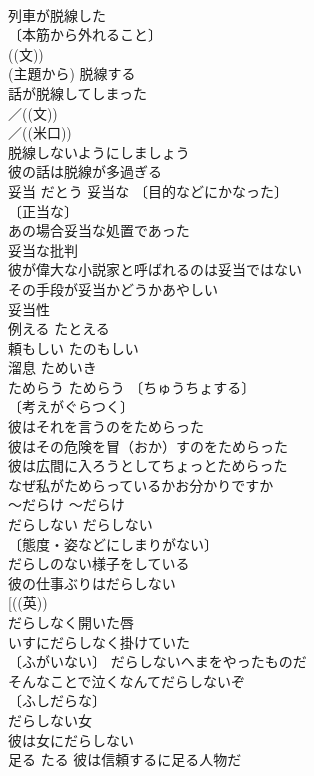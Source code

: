 \documentclass[8pt]{extreport}
\begin{document}
\begin{CJK}{UTF8}{min}
\\	列車が脱線した 
\\	〔本筋から外れること〕
\\	((文)) 
\\	(主題から) 脱線する 
\\	話が脱線してしまった 
\\	／((文)) 
\\	／((米口)) 
\\	脱線しないようにしましょう 
\\	彼の話は脱線が多過ぎる 
\\	妥当	だとう	妥当な 〔目的などにかなった〕
\\	〔正当な〕
\\	あの場合妥当な処置であった 
\\	妥当な批判 
\\	彼が偉大な小説家と呼ばれるのは妥当ではない 
\\	その手段が妥当かどうかあやしい 
\\	妥当性 
\\	例える	たとえる	
\\	頼もしい	たのもしい	
\\	溜息	ためいき	
\\	ためらう	ためらう	〔ちゅうちょする〕
\\	〔考えがぐらつく〕
\\	彼はそれを言うのをためらった 
\\	彼はその危険を冒（おか）すのをためらった 
\\	彼は広間に入ろうとしてちょっとためらった 
\\	なぜ私がためらっているかお分かりですか 
\\	～だらけ	～だらけ	
\\	だらしない	だらしない	
\\	〔態度・姿などにしまりがない〕
\\	だらしのない様子をしている 
\\	彼の仕事ぶりはだらしない 
\\	[((英)) 
\\	だらしなく開いた唇 
\\	いすにだらしなく掛けていた 
\\	〔ふがいない〕 だらしないへまをやったものだ 
\\	そんなことで泣くなんてだらしないぞ 
\\	〔ふしだらな〕
\\	だらしない女 
\\	彼は女にだらしない 
\\	足る	たる	彼は信頼するに足る人物だ 

\end{CJK}
\end{document}
